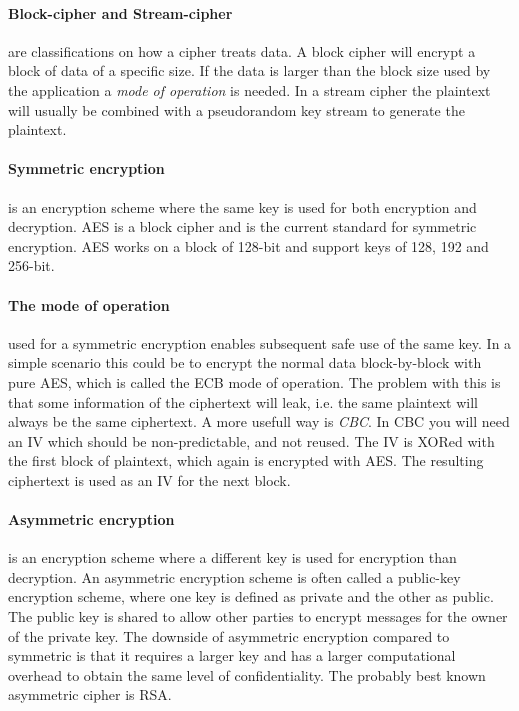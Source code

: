 \documentclass[pdftex,english,10pt,b5paper,twoside]{book}
\begin{document}
\paragraph{Block-cipher and Stream-cipher} are classifications on how a cipher
treats data\cite[p. 32]{stallings}. A block cipher will encrypt a block of data
of a specific size. If the data is larger than the block size used by the
application a \emph{mode of operation} is needed. In a stream cipher the
plaintext will usually be combined with a pseudorandom key stream to generate
the plaintext.

\paragraph{Symmetric encryption} is an encryption scheme where the same key is
used for both encryption and decryption\cite[p. 32]{stallings}. \ac{AES} is a
block cipher and is the current standard for symmetric encryption. \ac{AES}
works on a block of 128-bit and support keys of 128, 192 and 256-bit.

\paragraph{The mode of operation} used for a symmetric encryption enables
subsequent safe use of the same key. In a simple scenario this could be to
encrypt the normal data block-by-block with pure \ac{AES}, which is called the
\ac{ECB} mode of operation. The problem with this is that some information of
the ciphertext will leak, i.e. the same plaintext will always be the same
ciphertext. A more usefull way is \emph{\ac{CBC}}. In \ac{CBC} you will need an
\ac{IV} which should be non-predictable, and not reused. The \ac{IV} is XORed
with the first block of plaintext, which again is encrypted with \ac{AES}. The
resulting ciphertext is used as an \ac{IV} for the next block.

\paragraph{Asymmetric encryption} is an encryption scheme where a different key
is used for encryption than decryption\cite[p. 259]{stallings}. An asymmetric
encryption scheme is often called a public-key encryption scheme, where one key
is defined as private and the other as public. The public key is shared to
allow other parties to encrypt messages for the owner of the private key. The
downside of asymmetric encryption compared to symmetric is that it requires a
larger key and has a larger computational overhead to obtain the same level of
confidentiality. The probably best known asymmetric cipher is \ac{RSA}.
\end{document}
